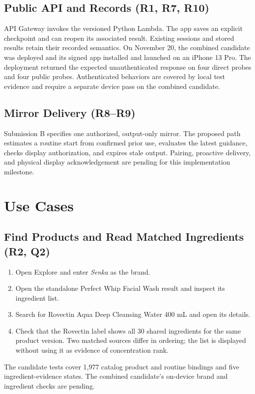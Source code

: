 \documentclass[conference,letterpaper]{IEEEtran}
\begin{document}
\subsection{Public API and Records (R1, R7, R10)}
API Gateway invokes the versioned Python Lambda. The app saves an explicit checkpoint and can reopen its associated result. Existing sessions and stored results retain their recorded semantics. On November 20, the combined candidate was deployed and its signed app installed and launched on an iPhone 13 Pro. The deployment returned the expected unauthenticated response on four direct probes and four public probes. Authenticated behaviors are covered by local test evidence and require a separate device pass on the combined candidate.

\subsection{Mirror Delivery (R8--R9)}
Submission B specifies one authorized, output-only mirror. The proposed path estimates a routine start from confirmed prior use, evaluates the latest guidance, checks display authorization, and expires stale output. Pairing, proactive delivery, and physical display acknowledgement are pending for this implementation milestone.

\section{Use Cases}

\subsection{Find Products and Read Matched Ingredients (R2, Q2)}
\begin{enumerate}
\item Open Explore and enter \emph{Senka} as the brand.
\item Open the standalone Perfect Whip Facial Wash result and inspect its ingredient list.
\item Search for Rovectin Aqua Deep Cleansing Water 400 mL and open its details.
\item Check that the Rovectin label shows all 30 shared ingredients for the same product version. Two matched sources differ in ordering; the list is displayed without using it as evidence of concentration rank.
\end{enumerate}
The candidate tests cover 1,977 catalog product and routine bindings and five ingredient-evidence states. The combined candidate's on-device brand and ingredient checks are pending.
\end{document}
